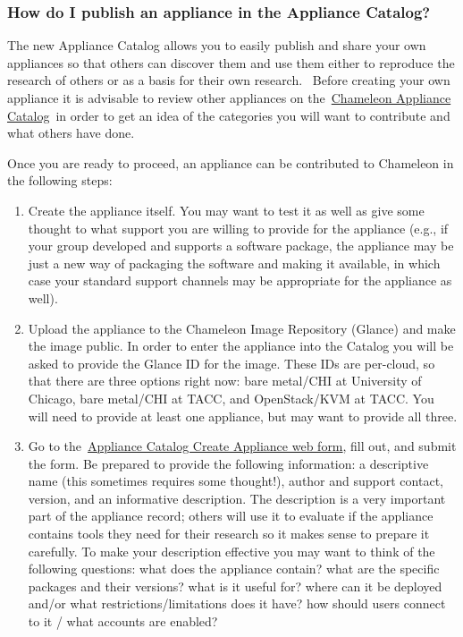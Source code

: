 \subsubsection{How do I publish an appliance in the Appliance Catalog?}\label{how-do-i-publish-an-appliance-in-the-chameleon-appliance-catalog}

The new Appliance Catalog allows you to easily publish and share your
own appliances so that others can discover them and use them either to
reproduce the research of others or as a basis for their own research.
~Before creating your own appliance it is advisable to review other
appliances on
the~\href{https://www.chameleoncloud.org/appliances/}{Chameleon
Appliance Catalog}~in order to get an idea of the categories you will
want to contribute and what others have done.~

Once you are ready to proceed, an appliance can be contributed to
Chameleon in the following steps:

\begin{enumerate}
\tightlist
\item
  Create the appliance itself. You may want to test it as well as give
  some thought to what support you are willing to provide for the
  appliance (e.g., if your group developed and supports a software
  package, the appliance may be just a new way of packaging the software
  and making it available, in which case your standard support channels
  may be appropriate for the appliance as well).
\item
  Upload the appliance to the Chameleon Image Repository (Glance) and
  make the image public. In order to enter the appliance into the
  Catalog you will be asked to provide the Glance ID for the image.
  These IDs are per-cloud, so that there are three options right now:
  bare metal/CHI at University of Chicago, bare metal/CHI at TACC, and
  OpenStack/KVM at TACC. You will need to provide at least one
  appliance, but may want to provide all three.
\item
  Go to
  the~\href{https://www.chameleoncloud.org/appliances/create/}{Appliance
  Catalog Create Appliance web form}, fill out, and submit the form. Be
  prepared to provide the following information: a descriptive name
  (this sometimes requires some thought!), author and support contact,
  version, and an informative description. The description is a very
  important part of the appliance record; others will use it to evaluate
  if the appliance contains tools they need for their research so it
  makes sense to prepare it carefully. To make your description
  effective you may want to think of the following questions: what does
  the appliance contain? what are the specific packages and their
  versions? what is it useful for? where can it be deployed and/or what
  restrictions/limitations does it have? how should users connect to it
  / what accounts are enabled?
\end{enumerate}

